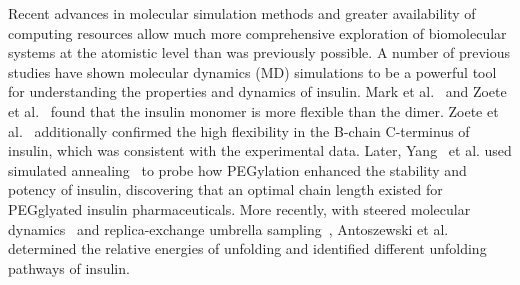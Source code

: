 \documentclass[9pt]{elife}
\begin{document}
Recent advances in molecular simulation methods and greater availability of computing resources allow much more comprehensive exploration of biomolecular systems at the atomistic level than was previously possible. A number of previous studies have shown molecular dynamics (MD) simulations to be a powerful tool for understanding the properties and dynamics of insulin. Mark et al.~\cite{mark1991conformational} and Zoete et al.~\cite{zoete2004comparison} found that the insulin monomer is more flexible than the dimer. Zoete et al.~\cite{zoete2004comparison} additionally confirmed the high flexibility in the B-chain C-terminus of insulin, which was consistent with the experimental data. Later, Yang~\cite{yang2011pegylation} et al. used simulated annealing~\cite{pincus1970letter} to probe how PEGylation enhanced the stability and potency of insulin, discovering that an optimal chain length existed for PEGglyated insulin pharmaceuticals. More recently, with steered molecular dynamics~\cite{isralewitz2001steered} and replica-exchange umbrella sampling~\cite{sugita2000multidimensional}, Antoszewski et al.~\cite{antoszewski2020insulin} determined the relative energies of unfolding and identified different unfolding pathways of insulin. 
\end{document}
